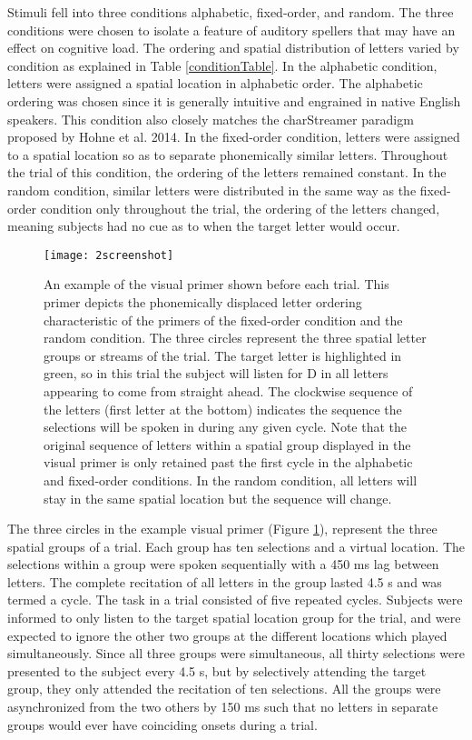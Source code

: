 \documentclass[10pt]{article}
\begin{document}
Stimuli fell into three conditions alphabetic, fixed-order,
and random.  The three conditions were chosen to isolate a
feature of auditory spellers that may have an effect on
cognitive load.  The ordering and spatial distribution of
letters varied by condition as explained in Table
\ref{conditionTable}.  In the alphabetic condition, letters
were assigned a spatial location in alphabetic order.  The
alphabetic ordering was chosen since it is generally intuitive
and engrained in native English speakers.  This condition
also closely matches the charStreamer paradigm proposed by
Hohne et al.  2014\cite{Hohne2014}.  In the fixed-order
condition, letters were assigned to a spatial location so as to
separate phonemically similar letters.  Throughout the trial
of this condition, the ordering of the letters remained
constant.  In the random condition, similar letters were
distributed in the same way as the fixed-order condition only
throughout the trial, the ordering of the letters changed,
meaning subjects had no cue as to when the target letter would
occur. 

\begin{figure}[t]
  \centering
  \texttt{[image: 2screenshot]}
  \caption{ An example of the visual primer shown before each
      trial.  This primer depicts the phonemically displaced
      letter ordering characteristic of the primers of the
      fixed-order condition and the random condition. The three circles
      represent the three spatial letter groups or streams of the trial.  The
      target letter is highlighted in green, so in this trial
      the subject will listen for D in all letters appearing to come
      from straight ahead.  The clockwise
      sequence of the letters (first letter at the bottom)
      indicates the sequence the selections will be spoken in
  during any given cycle.  Note that the original sequence of
  letters within a spatial group displayed in the visual primer is only
  retained past the first cycle in the alphabetic
  and fixed-order conditions. In the random condition, all
  letters will stay in the same spatial location but the
  sequence will change.}
  \label{screenshot}
\end{figure}

The three circles in the example visual primer (Figure
\ref{screenshot}), represent the three spatial groups of a trial.
Each group has ten selections and a virtual location.  The selections
within a group were spoken sequentially with a 450 ms lag
between letters.  The complete recitation of all letters in
the group lasted 4.5 s and was termed a cycle.  The task in a trial
consisted of five repeated cycles. Subjects were informed to
only listen to the target spatial location group for the
trial, and were expected to ignore the other two groups at the
different locations which played simultaneously. Since all
three groups were simultaneous, all thirty selections were
presented to the subject every 4.5 s, but by selectively
attending the target group, they only attended the recitation
of ten selections. All the groups were asynchronized from the
two others by 150 ms such that no letters in separate groups
would ever have coinciding onsets during a trial.
\end{document}
